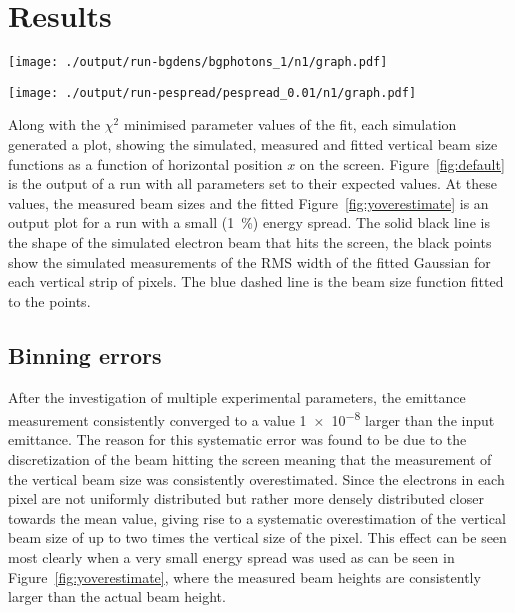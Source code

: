 
\section{Results}
\label{sec:results}

\begin{figure*}[!t]
	\begin{minipage}[t]{\columnwidth}
			\centering
			\texttt{[image: ./output/run-bgdens/bgphotons\_1/n1/graph.pdf]}
			\caption{
				The beam reconstruction (blue line) of a sumlation run with all the
				expected parameter values. \(E = \SI{1.3}{\giga\electronvolt}\),
				\(\sigma_E = \SI{0.4}{\giga\electronvolt}\), \(\epsilon =
				\SI{1}{\milli\meter\milli\radian}\)
			}
			\label{fig:default}
	\end{minipage}\hfill
	\begin{minipage}[t]{\columnwidth}
			\centering
			\texttt{[image: ./output/run-pespread/pespread\_0.01/n1/graph.pdf]}
			\caption{
				The beam reconstruction, consistently overestimates the vertical
				beam size. This run used a small percentage energy spread of
				\SI{1}{\percent}. With all other parameters set to their expected
				value.
			}
			\label{fig:yoverestimate}
	\end{minipage}
\end{figure*}

Along with the \(\chi^2\) minimised parameter values of the fit, each simulation
generated a plot, showing the simulated, measured and fitted vertical beam size
functions as a function of horizontal position \(x\) on the screen.
Figure~\ref{fig:default} is the output of a run with all parameters set to their
expected values. At these values, the measured beam sizes and the fitted
Figure~\ref{fig:yoverestimate} is an output plot for a run with a small
(\SI{1}{\percent}) energy spread. The solid black line is the shape of the
simulated electron beam that hits the screen, the black points show the
simulated measurements of the RMS width of the fitted Gaussian for each vertical
strip of pixels. The blue dashed line is the beam size function fitted to the
points.

\subsection{Binning errors}

After the investigation of multiple experimental parameters, the emittance
measurement consistently converged to a value \num{1e-8} larger than the input
emittance. The reason for this systematic error was found to be due to the
discretization of the beam hitting the screen meaning that the measurement of
the vertical beam size was consistently overestimated. Since the electrons in
each pixel are not uniformly distributed but rather more densely distributed
closer towards the mean value, giving rise to a systematic overestimation of the
vertical beam size of up to two times the vertical size of the pixel. This
effect can be seen most clearly when a very small energy spread was used as can
be seen in Figure~\ref{fig:yoverestimate}, where the measured beam heights are
consistently larger than the actual beam height.

